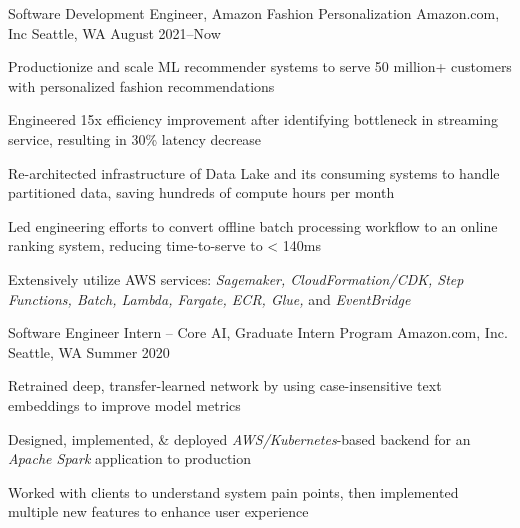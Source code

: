 \begin{cventries}
    \cventry
        {{\color{awesome}Software Development Engineer}, Amazon Fashion Personalization}
        {Amazon.com, Inc}
        {Seattle, WA}
        {August 2021--Now}
        {
            \begin{cvitems} 
                \item Productionize and scale ML recommender systems to serve 50 million+ customers with personalized fashion recommendations
                \item Engineered 15x efficiency improvement after identifying bottleneck in streaming service, resulting in 30\% latency decrease
                \item Re-architected infrastructure of Data Lake and its consuming systems to handle partitioned data, saving hundreds of compute hours per month
                \item Led engineering efforts to convert offline batch processing workflow to an online ranking system, reducing time-to-serve to < 140ms 
                \item Extensively utilize AWS services: \textit{Sagemaker, CloudFormation/CDK, Step Functions, Batch, Lambda, Fargate, ECR, Glue,} and \textit{EventBridge}
            \end{cvitems}
        }
        

    \cventry
        {{\color{awesome}Software Engineer Intern} -- Core AI, Graduate Intern Program}
        {Amazon.com, Inc.}
        {Seattle, WA}
        {Summer 2020}
        {
            \begin{cvitems} 
                \item Retrained deep, transfer-learned network by using case-insensitive text embeddings to improve model metrics
                \item Designed, implemented, \& deployed \textit{AWS/Kubernetes}-based backend for an \textit{Apache Spark} application to production
                \item Worked with clients to understand system pain points, then implemented multiple new features to enhance user experience
            \end{cvitems}
        }


\end{cventries}
